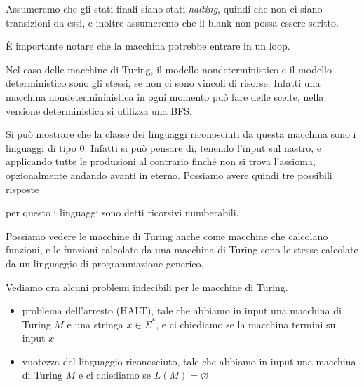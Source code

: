 \documentclass[12pt]{report}
\theoremstyle{definition}
\begin{document}
Assumeremo che gli stati finali siano stati \textit{halting}, quindi che non ci siano transizioni da essi, e inoltre assumeremo che il blank non possa essere scritto.

\`E importante notare che la macchina potrebbe entrare in un loop.

Nel caso delle macchine di Turing, il modello nondeterministico e il modello deterministico sono gli stessi, se non ci sono vincoli di risorse.
Infatti una macchina nondetermininistica in ogni momento può fare delle scelte, nella versione deterministica si utilizza una BFS.

Si può mostrare che la classe dei linguaggi riconosciuti da questa macchina sono i linguaggi di tipo 0.
Infatti si può pensare di, tenendo l'input sul nastro, e applicando tutte le produzioni al contrario finché non si trova l'assioma, opzionalmente andando avanti in eterno.
Possiamo avere quindi tre possibili risposte
\begin{center}
\end{center}
per questo i linguaggi sono detti ricorsivi numberabili.

Possiamo vedere le macchine di Turing anche come macchine che calcolano funzioni, e le funzioni calcolate da una macchina di Turing sono le stesse calcolate da un linguaggio di programmazione generico.

Vediamo ora alcuni problemi indecibili per le macchine di Turing.
\begin{itemize}
	\item problema dell'arresto (HALT), tale che abbiamo in input una macchina di Turing $M$ e una stringa $x \in \Sigma^*$, e ci chiediamo se la macchina termini su input $x$
	\item vuotezza del linguaggio riconosciuto, tale che abbiamo in input una macchina di Turing $M$ e ci chiediamo se $L(M) = \varnothing$
\end{itemize}
\end{document}

